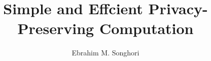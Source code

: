 \documentclass[12pt]{ruthesis}
\title{Simple and Effcient Privacy-Preserving Computation}
\author{Ebrahim M. Songhori}
\begin{document}
  \begin{frontmatter}
   \maketitle
   
   \tableofcontents
   \listoffigures
   \listoftables
%   
  \end{frontmatter}






\end{document}
